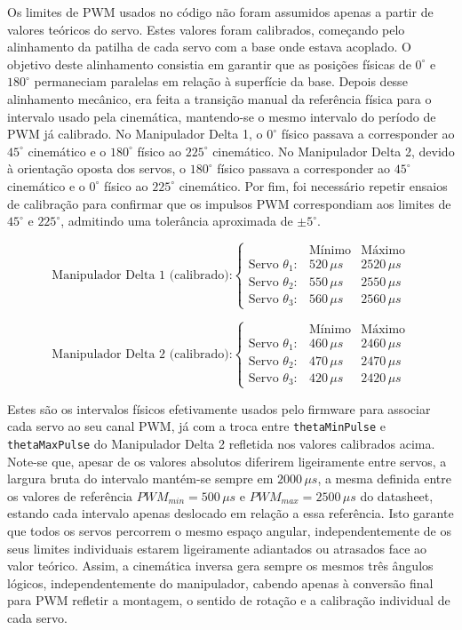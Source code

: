 Os limites de PWM usados no código não foram assumidos apenas a partir de valores teóricos do servo. Estes valores foram calibrados, começando pelo alinhamento da patilha de cada servo com a base onde estava acoplado. O objetivo deste alinhamento consistia em garantir que as posições físicas de \(0^\circ\) e \(180^\circ\) permaneciam paralelas em relação à superfície da base. Depois desse alinhamento mecânico, era feita a transição manual da referência física para o intervalo usado pela cinemática, mantendo-se o mesmo intervalo do período de PWM já calibrado. No Manipulador Delta 1, o \(0^\circ\) físico passava a corresponder ao \(45^\circ\) cinemático e o \(180^\circ\) físico ao \(225^\circ\) cinemático. No Manipulador Delta 2, devido à orientação oposta dos servos, o \(180^\circ\) físico passava a corresponder ao \(45^\circ\) cinemático e o \(0^\circ\) físico ao \(225^\circ\) cinemático. Por fim, foi necessário repetir ensaios de calibração para confirmar que os impulsos PWM correspondiam aos limites de \(45^\circ\) e \(225^\circ\), admitindo uma tolerância aproximada de \(\pm 5^\circ\).

\[
\text{Manipulador Delta 1 (calibrado):}
\left\{
\begin{array}{lcc}
& \text{Mínimo} & \text{Máximo}\\
\text{Servo } \theta_1: & 520\,\mu s & 2520\,\mu s\\
\text{Servo } \theta_2: & 550\,\mu s & 2550\,\mu s\\
\text{Servo } \theta_3: & 560\,\mu s & 2560\,\mu s
\end{array}
\right.
\]

\[
\text{Manipulador Delta 2 (calibrado):}
\left\{
\begin{array}{lcc}
& \text{Mínimo} & \text{Máximo}\\
\text{Servo } \theta_1: & 460\,\mu s & 2460\,\mu s\\
\text{Servo } \theta_2: & 470\,\mu s & 2470\,\mu s\\
\text{Servo } \theta_3: & 420\,\mu s & 2420\,\mu s
\end{array}
\right.
\]

Estes são os intervalos físicos efetivamente usados pelo firmware para associar cada servo ao seu canal PWM, já com a troca entre \texttt{thetaMinPulse} e \texttt{thetaMaxPulse} do Manipulador Delta 2 refletida nos valores calibrados acima. Note-se que, apesar de os valores absolutos diferirem ligeiramente entre servos, a largura bruta do intervalo mantém-se sempre em \(2000\,\mu s\), a mesma definida entre os valores de referência \(PWM_{min}=500\,\mu s\) e \(PWM_{max}=2500\,\mu s\) do datasheet, estando cada intervalo apenas deslocado em relação a essa referência. Isto garante que todos os servos percorrem o mesmo espaço angular, independentemente de os seus limites individuais estarem ligeiramente adiantados ou atrasados face ao valor teórico. Assim, a cinemática inversa gera sempre os mesmos três ângulos lógicos, independentemente do manipulador, cabendo apenas à conversão final para PWM refletir a montagem, o sentido de rotação e a calibração individual de cada servo.

